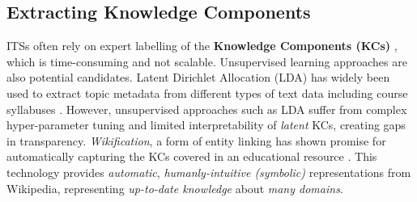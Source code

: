 \documentclass[letterpaper]{article} %
\begin{document}
\subsection{Extracting Knowledge Components}

ITSs often rely on expert labelling of the \textbf{Knowledge Components (KCs)} \cite{assistments_data} 
, which is time-consuming and not scalable. Unsupervised learning approaches
are also potential candidates.
{Latent Dirichlet Allocation (LDA) has widely been used to extract topic metadata from different types of text data including course syllabuses \cite{Apaza2014OnlineCR}. However, unsupervised approaches such as LDA suffer from complex hyper-parameter tuning \cite{PANICHELLA2021106411}} and limited interpretability of \emph{latent} KCs, creating gaps in transparency. %
\emph{Wikification}, a form of entity linking \cite{wikifier} 
has shown promise for automatically capturing the KCs covered in an educational resource \cite{truelearn}. This technology provides \emph{automatic}, \emph{humanly-intuitive (symbolic)} representations from Wikipedia, representing \emph{up-to-date knowledge} about \emph{many domains}. 
\end{document}
